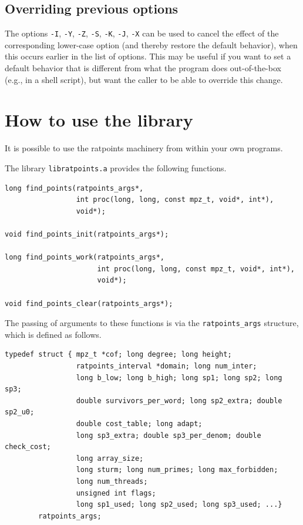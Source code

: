 \documentclass[12pt,a4paper,oneside]{amsart}
\begin{document}
\subsection{Overriding previous options}

The options \verb+-I+, \verb+-Y+, \verb+-Z+, \verb+-S+, \verb+-K+, \verb+-J+,
\verb+-X+ can be used to cancel the effect of the corresponding lower-case
option (and thereby restore the default behavior),
when this occurs earlier in the list of options. This may be useful if
you want to set a default behavior that is different from what the
program does out-of-the-box (e.g., in a shell script), but want the caller
to be able to override this change.


\section{How to use the library}\label{sec:library}

It is possible to use the ratpoints machinery from within your own programs.

The library \texttt{libratpoints.a} provides the following functions.

\begin{verbatim}
long find_points(ratpoints_args*,
                 int proc(long, long, const mpz_t, void*, int*),
                 void*);

void find_points_init(ratpoints_args*);

long find_points_work(ratpoints_args*,
                      int proc(long, long, const mpz_t, void*, int*),
                      void*);

void find_points_clear(ratpoints_args*);
\end{verbatim}

The passing of arguments to these functions is via the \texttt{ratpoints\_args}
structure, which is defined as follows.

\begin{verbatim}
typedef struct { mpz_t *cof; long degree; long height;
                 ratpoints_interval *domain; long num_inter;
                 long b_low; long b_high; long sp1; long sp2; long sp3;
                 double survivors_per_word; long sp2_extra; double sp2_u0;
                 double cost_table; long adapt;
                 long sp3_extra; double sp3_per_denom; double check_cost;
                 long array_size;
                 long sturm; long num_primes; long max_forbidden;
                 long num_threads;
                 unsigned int flags;
                 long sp1_used; long sp2_used; long sp3_used; ...}
        ratpoints_args;
\end{verbatim}
\end{document}
